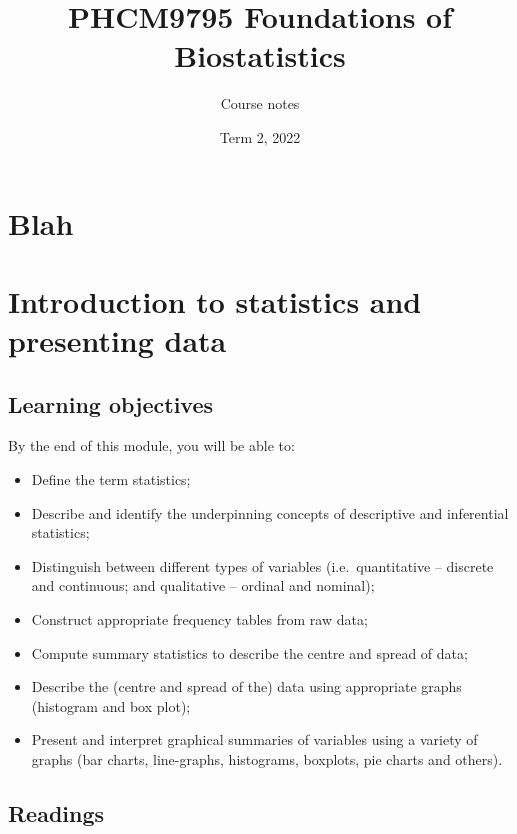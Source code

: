 \documentclass[
]{memoir}
\title{PHCM9795 Foundations of Biostatistics}
\author{Course notes}
\date{Term 2, 2022}
\providecommand{\tightlist}{%
  \setlength{\itemsep}{0pt}\setlength{\parskip}{0pt}}
\begin{document}
\maketitle

{
\setcounter{tocdepth}{1}
\tableofcontents
}
\hypertarget{blah}{%
\chapter*{Blah}\label{blah}}

\hypertarget{introduction-to-statistics-and-presenting-data}{%
\chapter{Introduction to statistics and presenting data}\label{introduction-to-statistics-and-presenting-data}}

\hypertarget{learning-objectives}{%
\section*{Learning objectives}\label{learning-objectives}}

By the end of this module, you will be able to:

\begin{itemize}
\tightlist
\item
  Define the term statistics;
\item
  Describe and identify the underpinning concepts of descriptive and inferential statistics;
\item
  Distinguish between different types of variables (i.e.~quantitative -- discrete and continuous; and qualitative -- ordinal and nominal);
\item
  Construct appropriate frequency tables from raw data;
\item
  Compute summary statistics to describe the centre and spread of data;
\item
  Describe the (centre and spread of the) data using appropriate graphs (histogram and box plot);
\item
  Present and interpret graphical summaries of variables using a variety of graphs (bar charts, line-graphs, histograms, boxplots, pie charts and others).
\end{itemize}

\hypertarget{readings}{%
\section*{Readings}\label{readings}}
\end{document}
